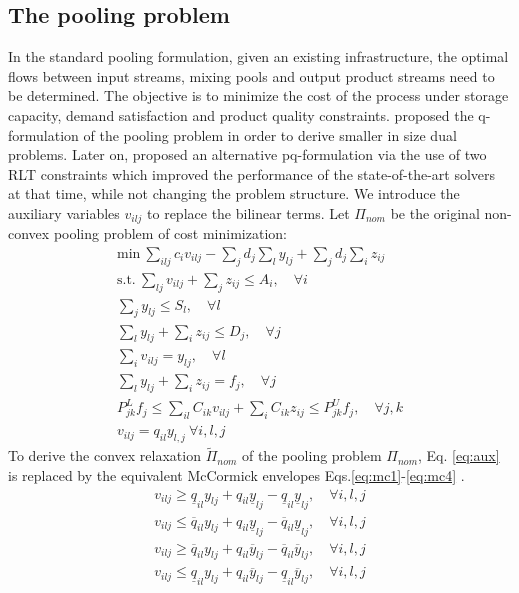 \documentclass[sn-mathphys-num]{sn-jnl}
\begin{document}
\subsection{The pooling problem}
In the standard pooling formulation, given an existing infrastructure, the optimal flows  between input streams, mixing pools and output product streams need to be determined. The objective is to minimize the cost of the process under storage capacity, demand satisfaction and product quality constraints. \citet{Bental94} proposed the q-formulation of the pooling problem in order to derive smaller in size dual problems. Later on, \citet{Sahinidis2005} proposed an alternative pq-formulation via the use of two RLT constraints which improved the performance of the state-of-the-art solvers at that time, while not changing the problem structure. We introduce the auxiliary variables $v_{ilj}$ to replace the bilinear terms. Let $\Pi_{nom}$ be the original non-convex pooling problem of cost minimization:
\begin{align}
{\text{min}}~\sum_{ilj}c_iv_{ilj} -\sum_{j}d_j\sum_{l}y_{lj}+\sum_{j}d_j\sum_{i}z_{ij}\label{eq:obj}\\
\text{s.t.}~ \sum_{lj}v_{ilj}+ \sum_j z_{ij} \leq A_i, \quad \forall i \\
\sum_j y_{lj} \leq S_l, \quad \forall l\\
\sum_l y_{lj}+\sum_i z_{ij}\leq D_j, \quad \forall j\\
\sum_i v_{ilj}=y_{lj}, \quad \forall l\\
\sum_l y_{lj}+ \sum_i z_{ij}=f_j, \quad \forall j\label{eq:flow}\\
P_{jk}^L f_j\leq \sum_{il}C_{ik} v_{ilj}+ \sum_i C_{ik} z_{ij}\leq P_{jk}^U f_j, \quad \forall j,k \label{eq:unc_quality}\\
v_{ilj}=q_{il}y_{l,j}~\forall i,l,j\label{eq:aux}
\end{align}  
To derive the convex relaxation $\tilde{\Pi}_{nom}$ of the pooling problem $\Pi_{nom}$, Eq. \eqref{eq:aux} is replaced by the equivalent McCormick envelopes Eqs.\eqref{eq:mc1}-\eqref{eq:mc4} \cite{McCormick1976}.
\begin{align}
v_{ilj} \geq \underline{q}_{il}y_{lj}+q_{il}\underline{y}_{lj} -\underline{q}_{il} \underline{y}_{lj},\quad \forall i,l,j\label{eq:mc1}\\
v_{ilj} \leq \overline{q}_{il}y_{lj}+q_{il}\underline{y}_{lj} -\overline{q}_{il} \underline{y}_{lj},\quad \forall i,l,j \\
v_{ilj} \geq \overline{q}_{il}y_{lj}+q_{il}\overline{y}_{lj} -\overline{q}_{il} \overline{y}_{lj},\quad \forall i,l,j \\
v_{ilj} \leq \underline{q}_{il}y_{lj}+q_{il}\overline{y}_{lj} -\underline{q}_{il} \overline{y}_{lj},\quad \forall i,l,j\label{eq:mc4}
\end{align}  
\end{document}
